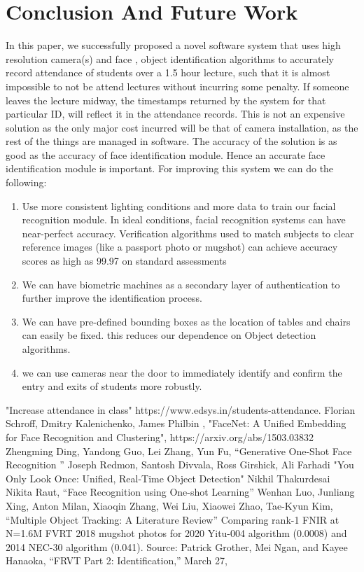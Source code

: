 \documentclass[10pt,twocolumn,letterpaper]{article}
\begin{document}
\section{Conclusion And Future Work}
In this paper, we successfully proposed a novel software system that uses high resolution camera(s) and face , object identification algorithms to accurately record attendance of students over a 1.5 hour lecture, such that it is almost impossible to not be attend lectures without incurring some penalty. If someone leaves the lecture midway, the timestamps returned by the system for that particular ID, will reflect it in the attendance records. This is not an expensive solution as the only major cost incurred will be that of camera installation, as the rest of the things are managed in software. The accuracy of the solution is as good as the accuracy of face identification module. Hence an accurate face identification module is important. 
For improving this system we can do the following:

\begin{enumerate}
    \item Use more consistent lighting conditions and more data to train our facial recognition module.
    In ideal conditions, facial recognition systems can have near-perfect accuracy. Verification algorithms used to match subjects to clear reference images (like a passport photo or mugshot) can achieve accuracy scores as high as 99.97 on standard assessments ~\cite{b7}
    \item We can have biometric machines as a secondary layer of authentication to further improve the identification process.
    \item We can have pre-defined bounding boxes as the location of tables and chairs can easily be fixed. this reduces our dependence on Object detection algorithms.
    \item we can use cameras near the door to immediately identify and confirm the entry and exits of students more robustly. 
\end{enumerate}




\begin{thebibliography}{00}
 "Increase attendance in class" https://www.edsys.in/students-attendance.
 Florian Schroff, Dmitry Kalenichenko, James Philbin , "FaceNet: A Unified Embedding for Face Recognition and Clustering", https://arxiv.org/abs/1503.03832
Zhengming Ding, Yandong Guo, Lei Zhang, Yun Fu, ``Generative One-Shot Face Recognition
'' 
 Joseph Redmon, Santosh Divvala, Ross Girshick, Ali Farhadi "You Only Look Once: Unified, Real-Time Object Detection"
Nikhil Thakurdesai Nikita Raut, ``Face Recognition using One-shot Learning'' 
 Wenhan Luo, Junliang Xing, Anton Milan, Xiaoqin Zhang, Wei Liu, Xiaowei Zhao, Tae-Kyun Kim,
``Multiple Object Tracking: A Literature Review'' 
 Comparing rank-1 FNIR at N=1.6M FVRT 2018 mugshot photos for 2020 Yitu-004 algorithm (0.0008) and 2014 NEC-30 algorithm (0.041). Source: Patrick Grother, Mei Ngan, and Kayee Hanaoka, “FRVT Part 2: Identification,” March 27,
\end{thebibliography}
\end{document}
